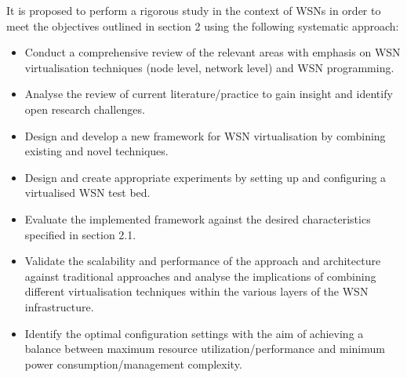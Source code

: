 It is proposed to perform a rigorous study in the context of WSNs in order to meet the objectives outlined in section 2 using the following systematic approach:

\begin{itemize}
\item Conduct a comprehensive review of the relevant areas with emphasis on WSN virtualisation techniques (node level, network level) and  WSN programming.
\item Analyse the review of current literature/practice to gain insight and identify open research challenges.
\item Design and develop a new framework for WSN virtualisation by combining existing and novel techniques. 
\item Design and create appropriate experiments by setting up and configuring a virtualised WSN test bed. 
\item Evaluate the implemented framework against the desired characteristics specified in section 2.1.
\item Validate the scalability and performance of the approach and architecture against traditional approaches and analyse the implications of combining different virtualisation techniques within the various layers of the WSN infrastructure.
\item Identify the optimal configuration settings with the aim of achieving a balance between maximum resource utilization/performance and minimum power consumption/management complexity.
\end{itemize}